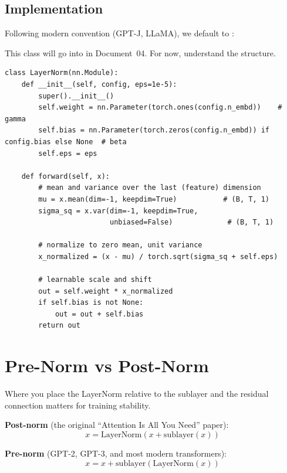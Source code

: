\subsection{Implementation}

Following modern convention (GPT-J, LLaMA), we default to :

This class will go into  in Document~04. For now, understand the structure.

\concepttag
\begin{lstlisting}
class LayerNorm(nn.Module):
    def __init__(self, config, eps=1e-5):
        super().__init__()
        self.weight = nn.Parameter(torch.ones(config.n_embd))    # gamma
        self.bias = nn.Parameter(torch.zeros(config.n_embd)) if config.bias else None  # beta
        self.eps = eps

    def forward(self, x):
        # mean and variance over the last (feature) dimension
        mu = x.mean(dim=-1, keepdim=True)           # (B, T, 1)
        sigma_sq = x.var(dim=-1, keepdim=True,
                         unbiased=False)             # (B, T, 1)

        # normalize to zero mean, unit variance
        x_normalized = (x - mu) / torch.sqrt(sigma_sq + self.eps)

        # learnable scale and shift
        out = self.weight * x_normalized
        if self.bias is not None:
            out = out + self.bias
        return out
\end{lstlisting}


\section{Pre-Norm vs Post-Norm}

Where you place the LayerNorm relative to the sublayer and the residual connection matters for training stability.

\textbf{Post-norm} (the original ``Attention Is All You Need'' paper):
\[
x = \mathrm{LayerNorm}(x + \mathrm{sublayer}(x))
\]

\textbf{Pre-norm} (GPT-2, GPT-3, and most modern transformers):
\[
x = x + \mathrm{sublayer}(\mathrm{LayerNorm}(x))
\]

